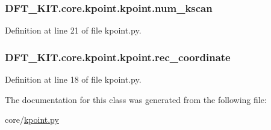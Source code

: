 \hypertarget{class_d_f_t___k_i_t_1_1core_1_1kpoint_1_1kpoint_afb23a76bba5dcc635dd1382896846783}{
\subsubsection[{num\+\_\+kscan}]{\setlength{\rightskip}{0pt plus 5cm}D\+F\+T\+\_\+\+K\+I\+T.\+core.\+kpoint.\+kpoint.\+num\+\_\+kscan}}\label{class_d_f_t___k_i_t_1_1core_1_1kpoint_1_1kpoint_afb23a76bba5dcc635dd1382896846783}


Definition at line 21 of file kpoint.\+py.

\hypertarget{class_d_f_t___k_i_t_1_1core_1_1kpoint_1_1kpoint_aeb4d70f1f0b809f96a2c19a3f1575c9b}{
\subsubsection[{rec\+\_\+coordinate}]{\setlength{\rightskip}{0pt plus 5cm}D\+F\+T\+\_\+\+K\+I\+T.\+core.\+kpoint.\+kpoint.\+rec\+\_\+coordinate}}\label{class_d_f_t___k_i_t_1_1core_1_1kpoint_1_1kpoint_aeb4d70f1f0b809f96a2c19a3f1575c9b}


Definition at line 18 of file kpoint.\+py.



The documentation for this class was generated from the following file\+:\begin{DoxyCompactItemize}
\item 
core/\hyperlink{kpoint_8py}{kpoint.\+py}\end{DoxyCompactItemize}

